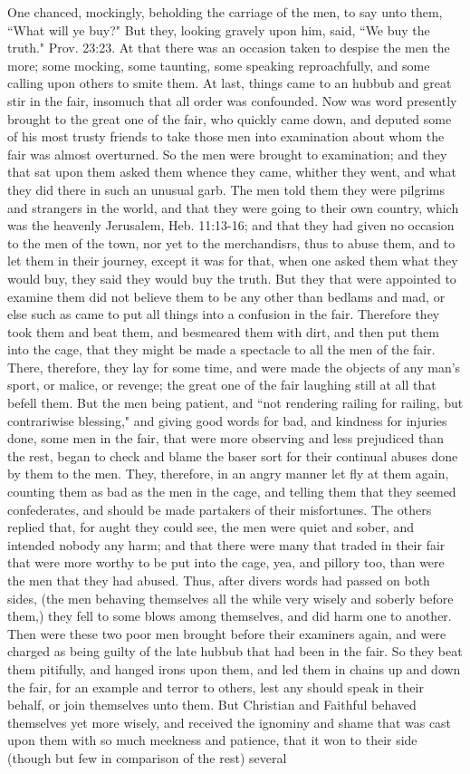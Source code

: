 One chanced, mockingly, beholding the carriage of the men, to say unto them, ``What will ye buy?" But they, looking gravely upon him, said, ``We buy the truth." Prov. 23:23. At that there was an occasion taken to despise the men the more; some mocking, some taunting, some speaking reproachfully, and some calling upon others to smite them. At last, things came to an hubbub and great stir in the fair, insomuch that all order was confounded. Now was word presently brought to the great one of the fair, who quickly came down, and deputed some of his most trusty friends to take those men into examination about whom the fair was almost overturned. So the men were brought to examination; and they that sat upon them asked them whence they came, whither they went, and what they did there in such an unusual garb. The men told them they were pilgrims and strangers in the world, and that they were going to their own country, which was the heavenly Jerusalem, Heb. 11:13-16; and that they had given no occasion to the men of the town, nor yet to the merchandisrs, thus to abuse them, and to let them in their journey, except it was for that, when one asked them what they would buy, they said they would buy the truth. But they that were appointed to examine them did not believe them to be any other than bedlams and mad, or else such as came to put all things into a confusion in the fair. Therefore they took them and beat them, and besmeared them with dirt, and then put them into the cage, that they might be made a spectacle to all the men of the fair. There, therefore, they lay for some time, and were made the objects of any man's sport, or malice, or revenge; the great one of the fair laughing still at all that befell them. But the men being patient, and ``not rendering railing for railing, but contrariwise blessing," and giving good words for bad, and kindness for injuries done, some men in the fair, that were more observing and less prejudiced than the rest, began to check and blame the baser sort for their continual abuses done by them to the men. They, therefore, in an angry manner let fly at them again, counting them as bad as the men in the cage, and telling them that they seemed confederates, and should be made partakers of their misfortunes. The others replied that, for aught they could see, the men were quiet and sober, and intended nobody any harm; and that there were many that traded in their fair that were more worthy to be put into the cage, yea, and pillory too, than were the men that they had abused. Thus, after divers words had passed on both sides, (the men behaving themselves all the while very wisely and soberly before them,) they fell to some blows among themselves, and did harm one to another. Then were these two poor men brought before their examiners again, and were charged as being guilty of the late hubbub that had been in the fair. So they beat them pitifully, and hanged irons upon them, and led them in chains up and down the fair, for an example and terror to others, lest any should speak in their behalf, or join themselves unto them. But Christian and Faithful behaved themselves yet more wisely, and received the ignominy and shame that was cast upon them with so much meekness and patience, that it won to their side (though but few in comparison of the rest) several 